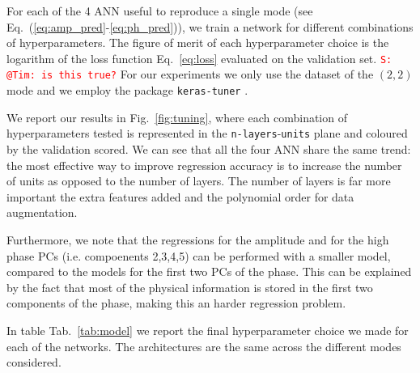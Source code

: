 \documentclass[twocolumn,showpacs,preprintnumbers,nofootinbib,prd,
superscriptaddress,10pt]{revtex4-1}
\newcommand{\stefano}[1]{{\textcolor{red}{\texttt{S: #1}} }}
\begin{document}
For each of the 4 ANN useful to reproduce a single mode (see Eq.~(\ref{eq:amp_pred}-\ref{eq:ph_pred})), we train a network for different combinations of hyperparameters. The figure of merit of each hyperparameter choice is the logarithm of the loss function Eq.~\eqref{eq:loss} evaluated on the validation set. \stefano{@Tim: is this true?}
For our experiments we only use the dataset of the $(2,2)$ mode and we employ the package \texttt{keras-tuner} \cite{omalley2019kerastuner}.

We report our results in Fig.~\ref{fig:tuning}, where each combination of hyperparameters tested is represented in the \texttt{n-layers}-\texttt{units} plane and coloured by the validation scored. 
We can see that all the four ANN share the same trend: the most effective way to improve regression accuracy is to increase the number of units as opposed to the number of layers.
The number of layers is far more important the extra features added and the polynomial order for data augmentation.

Furthermore, we note that the regressions for the amplitude and for the high phase PCs (i.e. compoenents 2,3,4,5) can be performed with a smaller model, compared to the models for the first two PCs of the phase. This can be explained by the fact that most of the physical information is stored in the first two components of the phase, making this an harder regression problem.

In table Tab.~\ref{tab:model} we report the final hyperparameter choice we made for each of the networks. The architectures are the same across the different modes considered.
\end{document}
